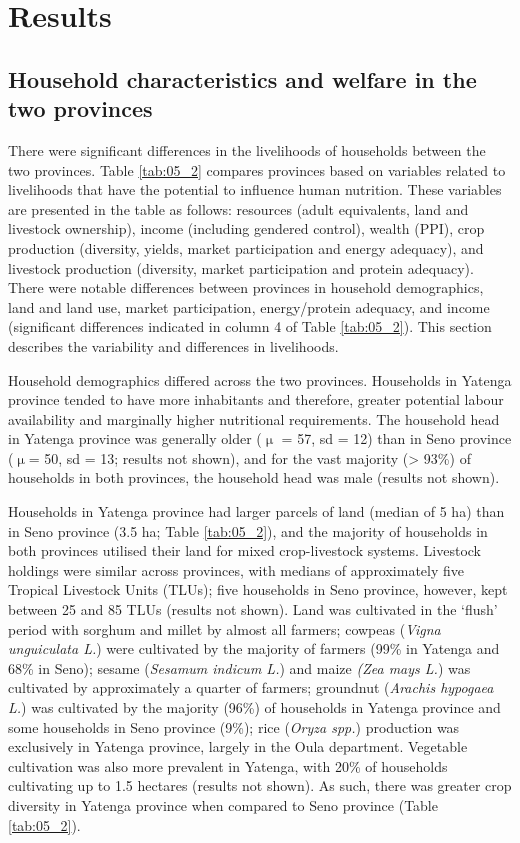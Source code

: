 \section{Results}

\subsection{Household characteristics and welfare in the two provinces}

There were significant differences in the livelihoods of households between the two provinces. Table \ref{tab:05_2} compares provinces based on variables related to livelihoods that have the potential to influence human nutrition. These variables are presented in the table as follows: resources (adult equivalents, land and livestock ownership), income (including gendered control), wealth (PPI), crop production (diversity, yields, market participation and energy adequacy), and livestock production (diversity, market participation and protein adequacy). There were notable differences between provinces in household demographics, land and land use, market participation, energy/protein adequacy, and income (significant differences indicated in column 4 of Table \ref{tab:05_2}). This section describes the variability and differences in livelihoods.

Household demographics differed across the two provinces. Households in Yatenga province tended to have more inhabitants and therefore, greater potential labour availability and marginally higher nutritional requirements. The household head in Yatenga province was generally older (${\upmu}$ = 57, sd = 12) than in Seno province (${\upmu}$= 50, sd = 13; results not shown), and for the vast majority ({\textgreater} 93\%) of households in both provinces, the household head was male (results not shown).

Households in Yatenga province had larger parcels of land (median of 5 ha) than in Seno province (3.5 ha; Table \ref{tab:05_2}), and the majority of households in both provinces utilised their land for mixed crop-livestock systems. Livestock holdings were similar across provinces, with medians of approximately five Tropical Livestock Units (TLUs); five households in Seno province, however, kept between 25 and 85 TLUs (results not shown). Land was cultivated in the `flush' period with sorghum and millet by almost all farmers; cowpeas (\textit{Vigna unguiculata L.}) were cultivated by the majority of farmers (99\% in Yatenga and 68\% in Seno); sesame (\textit{Sesamum indicum L.}) and maize \textit{(Zea mays L.}) was cultivated by approximately a quarter of farmers; groundnut (\textit{Arachis hypogaea L.}) was cultivated by the majority (96\%) of households in Yatenga province and some households in Seno province (9\%); rice (\textit{Oryza spp.}) production was exclusively in Yatenga province, largely in the Oula department. Vegetable cultivation was also more prevalent in Yatenga, with 20\% of households cultivating up to 1.5 hectares (results not shown). As such, there was greater crop diversity in Yatenga province when compared to Seno province (Table \ref{tab:05_2}).

